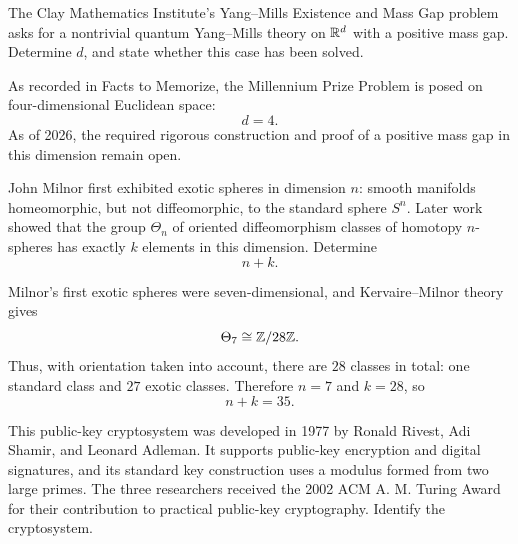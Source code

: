 
    \begin{expectedproblem}
        The Clay Mathematics Institute's Yang--Mills Existence and Mass Gap
        problem asks for a nontrivial quantum Yang--Mills theory on
        $\mathbb{R}^d$ with a positive mass gap. Determine $d$, and state whether this
        case has been solved.
    \end{expectedproblem}

    \begin{solution}
        As recorded in Facts to Memorize, the Millennium Prize Problem is posed
        on four-dimensional Euclidean space:
        \[
            \boxed{d=4}.
        \]
        As of 2026, the required rigorous construction and proof of a positive
        mass gap in this dimension remain open.
    \end{solution}

    \begin{expectedproblem}
        John Milnor first exhibited exotic spheres in dimension $n$: smooth
        manifolds homeomorphic, but not diffeomorphic, to the standard sphere
        $S^n$. Later work showed that the group $\Theta_n$ of oriented
        diffeomorphism classes of homotopy $n$-spheres has exactly $k$
        elements in this dimension. Determine
        \[
            n+k.
        \]
    \end{expectedproblem}

    \begin{solution}
        Milnor's first exotic spheres were seven-dimensional, and
        Kervaire--Milnor theory gives
        \[
            \Theta_7\cong\mathbb{Z}/28\mathbb{Z}.
        \]
        Thus, with orientation taken into account, there are $28$ classes in
        total: one standard class and $27$ exotic classes. Therefore $n=7$
        and $k=28$, so
        \[
            \boxed{n+k=35}.
        \]
    \end{solution}

    \begin{expectedproblem}
        This public-key cryptosystem was developed in 1977 by Ronald Rivest,
        Adi Shamir, and Leonard Adleman. It supports public-key encryption and
        digital signatures, and its standard key construction uses a modulus
        formed from two large primes. The three researchers received the 2002
        ACM A. M. Turing Award for their contribution to practical public-key
        cryptography. Identify the cryptosystem.
    \end{expectedproblem}

